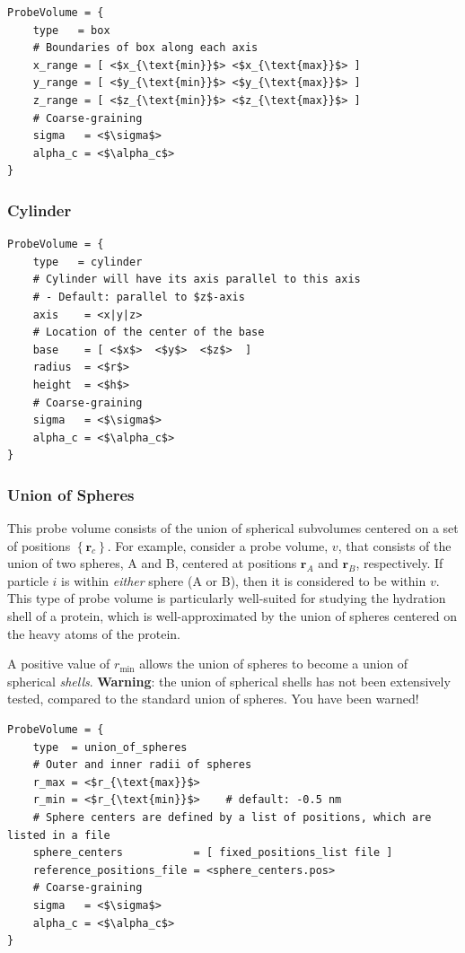 \documentclass[11pt,notitlepage]{article}
\begin{document}
\begin{lstlisting}
ProbeVolume = {
	type   = box
	# Boundaries of box along each axis
	x_range = [ <$x_{\text{min}}$> <$x_{\text{max}}$> ]
	y_range = [ <$y_{\text{min}}$> <$y_{\text{max}}$> ]
	z_range = [ <$z_{\text{min}}$> <$z_{\text{max}}$> ]
	# Coarse-graining
	sigma   = <$\sigma$>
	alpha_c = <$\alpha_c$>
}
\end{lstlisting}


\subsubsection{Cylinder}

\begin{lstlisting}
ProbeVolume = {
	type   = cylinder
	# Cylinder will have its axis parallel to this axis 
	# - Default: parallel to $z$-axis
	axis    = <x|y|z>
	# Location of the center of the base
	base    = [ <$x$>  <$y$>  <$z$>  ]
	radius  = <$r$>
	height  = <$h$>
	# Coarse-graining
	sigma   = <$\sigma$>
	alpha_c = <$\alpha_c$>
}
\end{lstlisting}


\subsubsection{Union of Spheres}

This probe volume consists of the union of spherical subvolumes centered on a set of positions $\left\{ \mathbf{r}_c \right\}$. For example, consider a probe volume, $v$, that consists of the union of two spheres, A and B, centered at positions $\mathbf{r}_A$ and $\mathbf{r}_B$, respectively. If particle $i$ is within \emph{either} sphere (A or B), then it is considered to be within $v$. This type of probe volume is particularly well-suited for studying the hydration shell of a protein, which is well-approximated by the union of spheres centered on the heavy atoms of the protein.

A positive value of $r_\text{min}$ allows the union of spheres to become a union of spherical \emph{shells}. \textbf{Warning}: the union of spherical shells has not been extensively tested, compared to the standard union of spheres. You have been warned!

\begin{lstlisting}
ProbeVolume = {
	type  = union_of_spheres
	# Outer and inner radii of spheres
	r_max = <$r_{\text{max}}$>
	r_min = <$r_{\text{min}}$>    # default: -0.5 nm
	# Sphere centers are defined by a list of positions, which are listed in a file
	sphere_centers           = [ fixed_positions_list file ]
	reference_positions_file = <sphere_centers.pos>
	# Coarse-graining
	sigma   = <$\sigma$>
	alpha_c = <$\alpha_c$>
}
\end{lstlisting}
\end{document}
